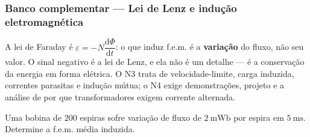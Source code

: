 
\subsubsection*{Banco complementar --- Lei de Lenz e indução eletromagnética}

\begin{atencao}
A lei de Faraday é $\varepsilon=-N\dfrac{\mathrm{d}\Phi}{\mathrm{d}t}$: o que
induz f.e.m. é a \textbf{variação} do fluxo, não seu valor. O sinal negativo é a
lei de Lenz, e ela não é um detalhe --- é a conservação da energia em forma
elétrica. O N3 trata de velocidade-limite, carga induzida, correntes parasitas e
indução mútua; o N4 exige demonstrações, projeto e a análise de por que
transformadores exigem corrente alternada.
\end{atencao}

\blocofixacao

\begin{questao}[1]{}
Uma bobina de $200$ espiras sofre variação de fluxo de
$\SI{2}{\milli\weber}$ por espira em $\SI{5}{\milli\second}$. Determine a
f.e.m. média induzida.
\end{questao}

